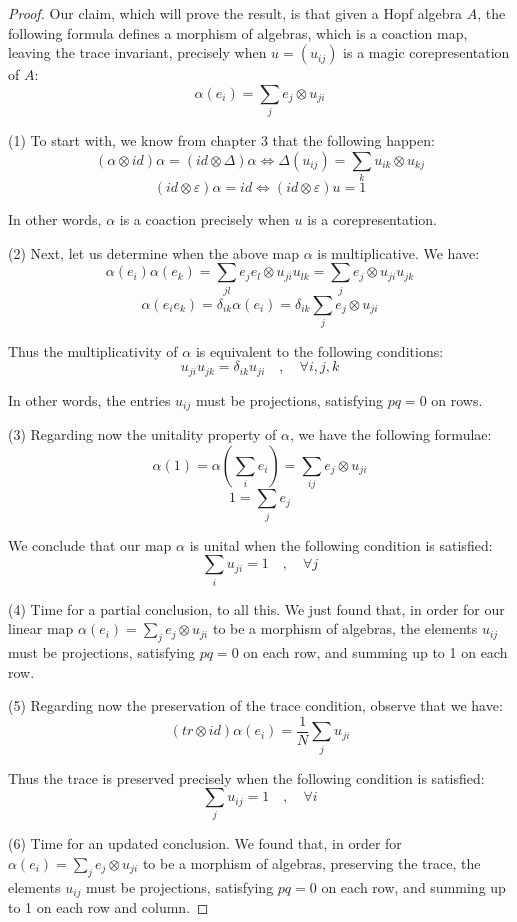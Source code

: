 \documentclass[12pt]{amsbook}
\begin{document}
\begin{proof}
Our claim, which will prove the result, is that given a Hopf algebra $A$, the following formula defines a morphism of algebras, which is a coaction map, leaving the trace invariant, precisely when $u=(u_{ij})$ is a magic corepresentation of $A$: 
$$\alpha(e_i)=\sum_je_j\otimes u_{ji}$$

(1) To start with, we know from chapter 3 that the following happen:
$$(\alpha\otimes id)\alpha=(id\otimes\Delta)\alpha\iff\Delta(u_{ij})=\sum_ku_{ik}\otimes u_{kj}$$
$$(id\otimes\varepsilon)\alpha=id\iff (id\otimes\varepsilon)u=1$$

In other words, $\alpha$ is a coaction precisely when $u$ is a corepresentation.

\medskip

(2) Next, let us determine when the above map $\alpha$ is multiplicative. We have:
$$\alpha(e_i)\alpha(e_k)
=\sum_{jl}e_je_l\otimes u_{ji}u_{lk}
=\sum_je_j\otimes u_{ji}u_{jk}$$
$$\alpha(e_ie_k)
=\delta_{ik}\alpha(e_i)
=\delta_{ik}\sum_je_j\otimes u_{ji}$$

Thus the multiplicativity of $\alpha$ is equivalent to the following conditions:
$$u_{ji}u_{jk}=\delta_{ik}u_{ji}\quad,\quad\forall i,j,k$$

In other words, the entries $u_{ij}$ must be projections, satisfying $pq=0$ on rows.

\medskip

(3) Regarding now the unitality property of $\alpha$, we have the following formulae:
$$\alpha(1)=\alpha\left(\sum_ie_i\right)=\sum_{ij}e_j\otimes u_{ji}$$
$$1=\sum_je_j$$

We conclude that our map $\alpha$ is unital when the following condition is satisfied:
$$\sum_iu_{ji}=1\quad,\quad\forall j$$

(4) Time for a partial conclusion, to all this. We just found that, in order for our linear map $\alpha(e_i)=\sum_je_j\otimes u_{ji}$ to be a morphism of algebras, the elements $u_{ij}$ must be projections, satisfying $pq=0$ on each row, and summing up to 1 on each row. 

\medskip

(5) Regarding now the preservation of the trace condition, observe that we have:
$$(tr\otimes id)\alpha(e_i)=\frac{1}{N}\sum_ju_{ji}$$

Thus the trace is preserved precisely when the following condition is satisfied:
$$\sum_ju_{ij}=1\quad,\quad\forall i$$

(6) Time for an updated conclusion. We found that, in order for $\alpha(e_i)=\sum_je_j\otimes u_{ji}$ to be a morphism of algebras, preserving the trace, the elements $u_{ij}$ must be projections, satisfying $pq=0$ on each row, and summing up to 1 on each row and column. 


\end{proof}
\end{document}
